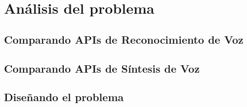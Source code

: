 \chapter{Análisis del problema}

\noindent{}

\section{Comparando APIs de Reconocimiento de Voz}

\section{Comparando APIs de Síntesis de Voz}

\section{Diseñando el problema}
 
